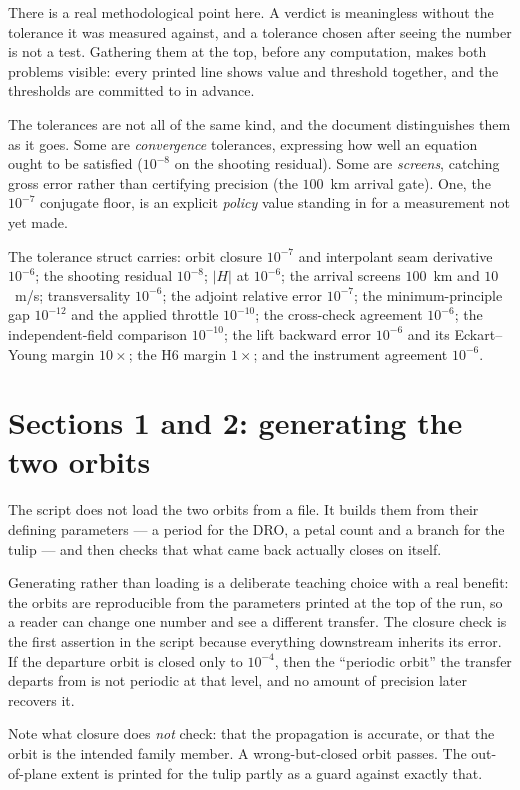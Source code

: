 \documentclass[11pt]{article}
\begin{document}
\begin{intu}
There is a real methodological point here. A verdict is meaningless without the
tolerance it was measured against, and a tolerance chosen after seeing the
number is not a test. Gathering them at the top, before any computation, makes
both problems visible: every printed line shows value and threshold together,
and the thresholds are committed to in advance.

The tolerances are not all of the same kind, and the document distinguishes
them as it goes. Some are \emph{convergence} tolerances, expressing how well an
equation ought to be satisfied ($10^{-8}$ on the shooting residual). Some are
\emph{screens}, catching gross error rather than certifying precision (the
$100$~km arrival gate). One, the $10^{-7}$ conjugate floor, is an explicit
\emph{policy} value standing in for a measurement not yet made.
\end{intu}

\begin{rig}
The tolerance struct carries: orbit closure $10^{-7}$ and interpolant seam
derivative $10^{-6}$; the shooting residual $10^{-8}$; $|H|$ at $10^{-6}$; the
arrival screens $100$~km and $10$~m/s; transversality $10^{-6}$; the adjoint
relative error $10^{-7}$; the minimum-principle gap $10^{-12}$ and the applied
throttle $10^{-10}$; the cross-check agreement $10^{-6}$; the independent-field
comparison $10^{-10}$; the lift backward error $10^{-6}$ and its Eckart--Young
margin $10\times$; the H6 margin $1\times$; and the instrument agreement
$10^{-6}$.
\end{rig}

\section{Sections 1 and 2: generating the two orbits}\label{sec:sec12}

\begin{eli}
The script does not load the two orbits from a file. It builds them from their
defining parameters --- a period for the DRO, a petal count and a branch for the
tulip --- and then checks that what came back actually closes on itself.
\end{eli}

\begin{intu}
Generating rather than loading is a deliberate teaching choice with a real
benefit: the orbits are reproducible from the parameters printed at the top of
the run, so a reader can change one number and see a different transfer. The
closure check is the first assertion in the script because everything
downstream inherits its error. If the departure orbit is closed only to
$10^{-4}$, then the ``periodic orbit'' the transfer departs from is not
periodic at that level, and no amount of precision later recovers it.

Note what closure does \emph{not} check: that the propagation is accurate, or
that the orbit is the intended family member. A wrong-but-closed orbit passes.
The out-of-plane extent is printed for the tulip partly as a guard against
exactly that.
\end{intu}
\end{document}
